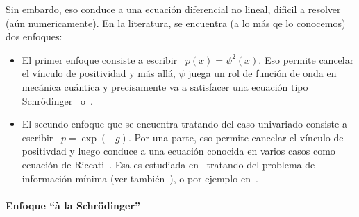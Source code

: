 %

Sin  embardo, eso  conduce a  una ecuaci\'on  diferencial no  lineal, dificil  a
resolver (a\'un numericamente).   En la literatura, se encuentra (a  lo m\'as qe
lo conocemos) dos enfoques:
%
\begin{itemize}
%
\item El primer enfoque consiste  a escribir \  $p(x) = \psi^2(x)$.  Eso permite
cancelar el  v\'inculo de  positividad y  m\'as all\'a, $\psi$  juega un  rol de
funci\'on de  onda en mec\'anica cu\'antica  y precisamente va a  satisfacer una
ecuaci\'on tipo Schr\"odinger~\cite{Fri89,  Fri90, FriSof95, FriPla99, FriPla02,
Fri98, Fri04} o~\cite{BorLew96, BorLew95, BerVig09}.
%
\item El  secundo enfoque que se encuentra tratando del caso univariado consiste
a escribir  \ $\displaystyle  p = \exp\left(  - g \right)$.  Por una  parte, eso
permite cancelar  el v\'inculo de  positivdad y  luego conduce a  una ecuaci\'on
conocida  en varios  casos como  ecuaci\'on de  Riccati~\cite{Ric1724}.  Esa  es
estudiada en~\cite{Ziv98}  tratando del problema de  informaci\'on m\'inima (ver
tambi\'en~\cite{BorLew96, BorLew96, Ziv98, FriPla99}), o por ejemplo en~\cite{}.
\end{itemize}






\paragraph{Enfoque ``\`a la Schr\"odinger''}

